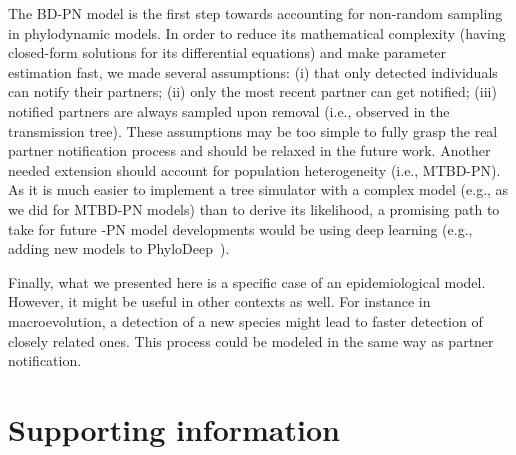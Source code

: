 \documentclass[10pt,letterpaper]{article}
\begin{document}
\bigskip 

The BD-PN model is the first step towards accounting for non-random sampling in phylodynamic models. In order to reduce its mathematical complexity (having closed-form solutions for its differential equations) and make parameter estimation fast, we made several assumptions: (i) that only detected individuals can notify their partners; (ii) only the most recent partner can get notified; (iii) notified partners are always sampled upon removal (i.e., observed in the transmission tree). These assumptions may be too simple to fully grasp the real partner notification process and should be relaxed in the future work. Another needed extension should account for population heterogeneity (i.e., MTBD-PN). As it is much easier to implement a tree simulator with a complex model (e.g., as we did for MTBD-PN models) than to derive its likelihood, a promising path to take for future -PN model developments would be using deep learning (e.g., adding new models to PhyloDeep~\cite{Voznica2021}). 

Finally, what we presented here is a specific case of an epidemiological model. However, it might be useful in other contexts as well. For instance in macroevolution, a detection of a new species might lead to faster detection of closely related ones. This process could be modeled in the same way as partner notification. 


\section*{Supporting information}
\end{document}
